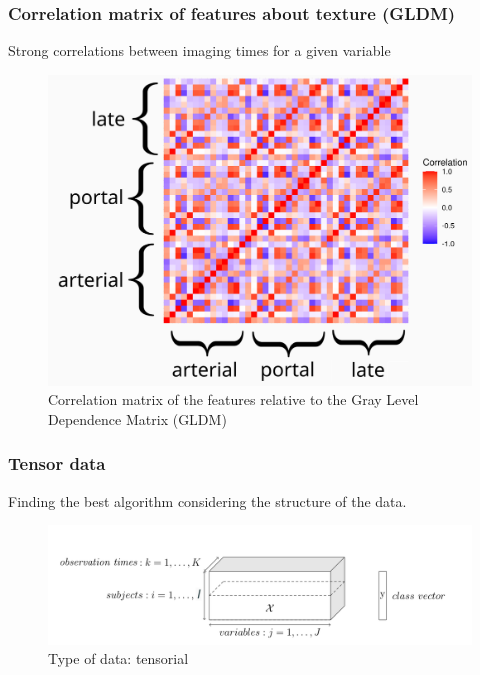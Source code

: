 \documentclass{beamer}
\begin{document}
\begin{frame}
    \frametitle{Correlation matrix of features about texture (GLDM)}
    Strong correlations between imaging times for a given variable
    \begin{figure}
        \centering
        \includegraphics[scale = 0.1]{images/correlation.png}
        \caption{Correlation matrix of the features relative to the Gray Level Dependence Matrix (GLDM)}
    \end{figure}

\end{frame}

\begin{frame}
    \frametitle{Tensor data}
    Finding the best algorithm considering the structure of the data.
    \begin{figure}
        \centering
        \includegraphics[scale = 0.3]{images/tensor.png}
        \caption{Type of data: tensorial}
    \end{figure}


\end{frame}
\end{document}
